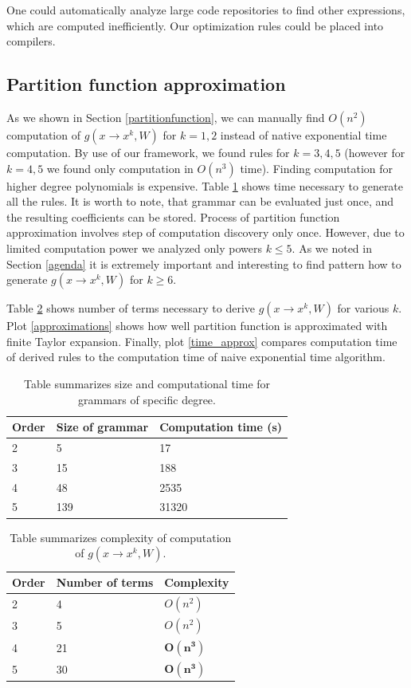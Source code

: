 One could automatically analyze large code repositories to find other expressions, which are computed inefficiently. 
Our optimization rules could be placed into compilers.

\subsection{Partition function approximation}

As we shown in Section \ref{partitionfunction}, we can manually find $O(n^2)$ computation of $g(x \rightarrow x^k, W)$ for $k = 1, 2$ 
instead of native exponential time computation. By use of
our framework, we found rules for $k = 3, 4, 5$ (however for $k = 4, 5$ we found only computation in $O(n^3)$ time). 
Finding computation for higher degree polynomials is expensive.
Table \ref{grammars} shows time necessary to
generate all the rules. It is worth to note, that grammar can be evaluated just once, and the resulting coefficients can 
be stored. Process of partition function approximation involves step of computation discovery only once. However, due to limited computation power
we analyzed only powers $k \leq 5$. As we noted in Section \ref{agenda}
it is extremely important and interesting to find pattern how to generate $g(x \rightarrow x^k, W)$ for $k \geq 6$.


Table \ref{eval} shows number of terms necessary to derive $g(x \rightarrow x^k, W)$ for various $k$. Plot \ref{approximations} shows 
how well partition function is approximated with finite Taylor expansion. Finally, plot \ref{time_approx} 
compares computation time of derived rules to the computation time of naive exponential time algorithm.

\begin{table}
\tiny
\centering
\begin{tabular}{|l||l|l|}
\hline\hline
Order & Size of grammar & Computation time (s) \\
\hline\hline
2 & 5 & 17 \\
3 & 15 & 188 \\
4 & 48 & 2535\\
5 & 139 & 31320 \\
\hline
\end{tabular}
\caption{Table summarizes size and computational time for grammars of specific degree.}
\label{grammars}
\end{table}

\begin{table}
\tiny
\centering
\begin{tabular}{|l|l|l|}
\hline\hline
Order & Number of terms & Complexity \\
\hline\hline
2 & 4 & $O(n^2)$\\
3 & 5 & $O(n^2)$\\
4 & 21 & $\mathbf{O(n^3)}$\\
5 & 30 & $\mathbf{O(n^3)}$\\
\hline
\end{tabular}
\caption{Table summarizes complexity of computation of $g(x \rightarrow x^k, W)$.} 
\label{eval}
\end{table}

